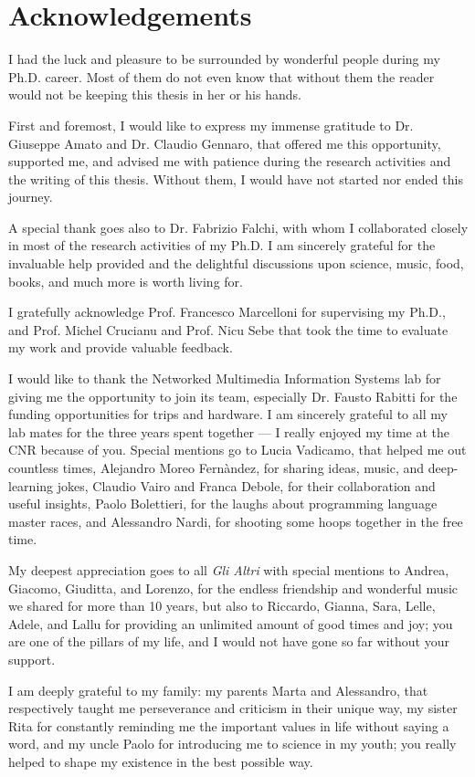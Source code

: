 \chapter*{Acknowledgements}
\lettrine{I}{} had the luck and pleasure to be surrounded by wonderful people during my Ph.D. career. Most of them do not even know that without them the reader would not be keeping this thesis in her or his hands.

First and foremost, I would like to express my immense gratitude to Dr. Giuseppe Amato and Dr. Claudio Gennaro, that offered me this opportunity, supported me, and advised me with patience during the research activities and the writing of this thesis. Without them, I would have not started nor ended this journey.

A special thank goes also to Dr. Fabrizio Falchi, with whom I collaborated closely in most of the research activities of my Ph.D. I am sincerely grateful for the invaluable help provided and the delightful discussions upon science, music, food, books, and much more is worth living for.

I gratefully acknowledge Prof. Francesco Marcelloni for supervising my Ph.D., and Prof. Michel Crucianu and Prof. Nicu Sebe that took the time to evaluate my work and provide valuable feedback.

I would like to thank the Networked Multimedia Information Systems lab for giving me the opportunity to join its team, especially Dr. Fausto Rabitti for the funding opportunities for trips and hardware.
I am sincerely grateful to all my lab mates for the three years spent together --- I really enjoyed my time at the CNR because of you. Special mentions go to Lucia Vadicamo, that helped me out countless times, Alejandro Moreo Fernàndez, for sharing ideas, music, and deep-learning jokes, Claudio Vairo and Franca Debole, for their collaboration and useful insights, Paolo Bolettieri, for the laughs about programming language master races, and Alessandro Nardi, for shooting some hoops together in the free time.

My deepest appreciation goes to all \emph{Gli Altri} with special mentions to Andrea, Giacomo, Giuditta, and Lorenzo, for the endless friendship and wonderful music we shared for more than 10 years, but also to Riccardo, Gianna, Sara, Lelle, Adele, and Lallu for providing an unlimited amount of good times and joy;
you are one of the pillars of my life, and I would not have gone so far without your support.

I am deeply grateful to my family: my parents Marta and Alessandro, that respectively taught me perseverance and criticism in their unique way, my sister Rita for constantly reminding me the important values in life without saying a word, and my uncle Paolo for introducing me to science in my youth;
you really helped to shape my existence in the best possible way.

